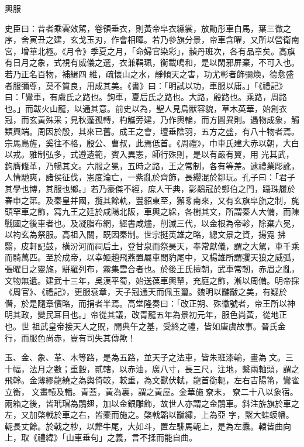 
\begin{pinyinscope}

 輿服



 史臣曰：昔者乘雲效駕，卷領垂衣，則黃帝皁衣纁裳，放勛彤車白馬，葉三微之序，舍寅丑之建，玄戈玉刃，作會相暉。若乃參旗分景，帝車含曜，又所以營衛南宮，增華北極。《月令》季夏之月，「命婦官染彩」，赬丹班次，各有品章矣。高旗有日月之象，式視有威儀之選，衣兼鞙珮，衡載鳴和，是以閑邪屏棄，不可入也。若乃正名百物，補緝四
 維，疏懷山之水，靜傾天之害，功尤彰者飾彌煥，德愈盛者服彌尊，莫不質良，用成其美。《書》曰：「明試以功，車服以庸。」「《禮記》曰：「鸞車，有虞氏之路也。鉤車，夏后氏之路也。大路，殷路也。乘路，周路也。」而韍火山龍，以通其意。前史以為，聖人見鳥獸容貌，草木英華，始創衣冠，而玄黃殊采；見秋蓬孤轉，杓觿旁建，乃作輿輪，而方圓異則。遇物成象，觸類興端。周因於殷，其來已舊。成王之會，壇垂陰羽，五方之盛，有八十物者焉。宗馬鳥旌，奚往不格，殷公、曹叔，此焉低首。《周禮》，巾車氏建大赤以朝，大白以戎。雅制弘多，式遵遺範，賓入異憲，師行殊則，是以有嚴有翼，用
 光其武，鉤膺鞗革，乃暢其文。六服之冕，五時之路，王之常制，各有等差。逮禮業彫訛，人情馳爽，諸侯征伐，憲度淪亡，一紫亂於齊飾，長纓混於鄒玩。孔子曰：「君子其學也博，其服也鄉。」若乃豪傑不經，庶人干典，彯鷸冠於鄭伯之門，躡珠履於春申之第。及秦皇并國，攬其餘軌，豐貂東至，獬豸南來，又有玄旗皁旒之制，旄頭罕車之飾，寫九王之廷於咸陽北阪，車輿之綵，各樹其文，所謂秦人大備，而陳戰國之後車者也。及凝脂布網，經書咸燼，削滅三代，以金根為帝軫，除棄六冕，以袀玄為祭服。高祖入關，既因秦制。世宗挺英雄之略，總文景之資，揚霓
 拂翳，皮軒記鼓，橫汾河而祠后土，登甘泉而祭昊天，奉常獻儀，謂之大駕，車千乘而騎萬匹。至於成帝，以幸姬趙飛燕置屬車間豹尾中，又楊雄所謂彏天狼之威弧，張曜日之靈旄，駢羅列布，霧集雲合者也。於後王氏擅朝，武車常軔，赤眉之亂，文物無遺。建武十三年，吳漢平蜀，始送葆車輿輦，充庭之飾，漸以周備。明帝採《周官》、《禮記》，更服袞章，天子冠通天而佩玉璽。魏明以黼黻之美，有疑於僭，於是隨章儐略，而捐者半焉。高堂隆奏曰：「改正朔、殊徽號者，帝王所以神明其政，變民耳目也。」帝從其議，改青龍五年為景初元年，服色尚黃，從地正也。世
 祖武皇帝接天人之貺，開典午之基，受終之禮，皆如唐虞故事。晉氏金行，而服色尚赤，豈有司失其傳歟！



 玉、金、象、革、木等路，是為五路，並天子之法車，皆朱班漆輪，畫為𣝛文。三十幅，法月之數；重轂，貳轄，以赤油，廣八寸，長三尺，注地，繫兩軸頭，謂之飛軨。金薄繆龍繞之為輿倚較，較重，為文獸伏軾，龍首銜軛，左右吉陽筩，鸞雀立衡，𣝛文畫轅及轓。青蓋，黃為裏，謂之黃屋。金華施尞末，尞二十八以象宿。兩箱之後，皆玳瑁為鵾翅，加以金銀雕飾，故世人亦謂之金鵾車。斜注旂旗於車之左，又加棨戟於車之右，皆橐而施之。棨戟韜以黻繡，上為亞
 字，繫大蛙蟆幡。軛長丈餘。於戟之杪，以犛牛尾，大如斗，置左騑馬軛上，是為左纛。轅皆曲向上，取《禮緯》「山車垂句」之義，言不揉而能自曲。




\end{pinyinscope}
